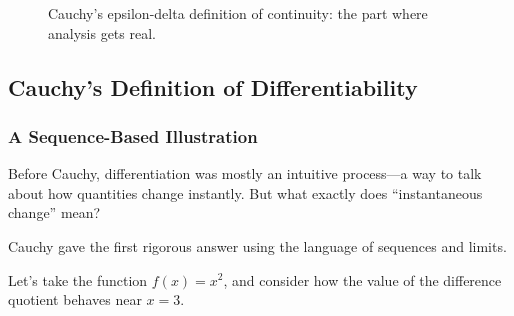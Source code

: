\begin{center}
\begin{figure}[H]
\centering
{}
\caption{Cauchy's epsilon-delta definition of continuity: the part where analysis gets real.}
\end{figure}
\end{center}






\subsection{Cauchy’s Definition of Differentiability}

\subsubsection{A Sequence-Based Illustration}

Before Cauchy, differentiation was mostly an intuitive process—a way to talk about how quantities change instantly. But what exactly does “instantaneous change” mean?

Cauchy gave the first rigorous answer using the language of sequences and limits.


Let’s take the function \( f(x) = x^2 \), and consider how the value of the difference quotient behaves near \( x = 3 \).

